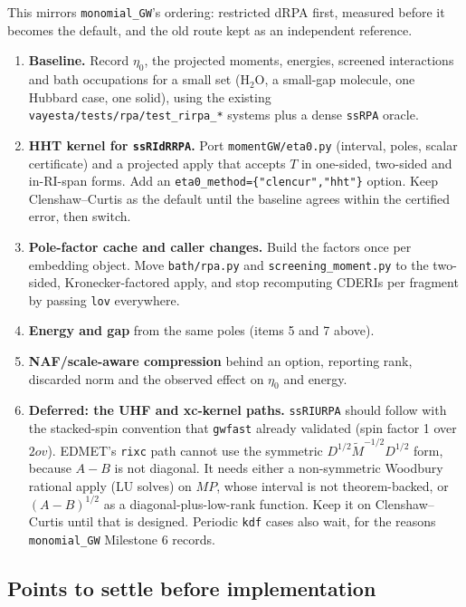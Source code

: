 \documentclass[11pt,a4paper]{article}
\newcommand{\code}[1]{\texttt{\small #1}}
\newcommand{\ov}{ov}
\newcommand{\Mt}{\tilde{M}}
\begin{document}
This mirrors \code{monomial\_GW}'s ordering: restricted dRPA first, measured before it becomes
the default, and the old route kept as an independent reference.
\begin{enumerate}
  \item \textbf{Baseline.} Record $\eta_0$, the projected moments, energies, screened
        interactions and bath occupations for a small set (H$_2$O, a small-gap molecule, one
        Hubbard case, one solid), using the existing \code{vayesta/tests/rpa/test\_rirpa\_*}
        systems plus a dense \code{ssRPA} oracle.
  \item \textbf{HHT kernel for \code{ssRIdRRPA}.} Port \code{momentGW/eta0.py} (interval, poles,
        scalar certificate) and a projected apply that accepts $T$ in one-sided, two-sided and
        in-RI-span forms. Add an \code{eta0\_method=\{"clencur","hht"\}} option. Keep
        Clenshaw--Curtis as the default until the baseline agrees within the certified error,
        then switch.
  \item \textbf{Pole-factor cache and caller changes.} Build the factors once per embedding
        object. Move \code{bath/rpa.py} and \code{screening\_moment.py} to the two-sided,
        Kronecker-factored apply, and stop recomputing CDERIs per fragment by passing
        \code{lov} everywhere.
  \item \textbf{Energy and gap} from the same poles (items 5 and 7 above).
  \item \textbf{NAF/scale-aware compression} behind an option, reporting rank, discarded norm
        and the observed effect on $\eta_0$ and energy.
  \item \textbf{Deferred: the UHF and xc-kernel paths.} \code{ssRIURPA} should follow with the
        stacked-spin convention that \code{gwfast} already validated (spin factor 1 over
        $2\ov$). EDMET's \code{rixc} path cannot use the symmetric
        $D^{1/2}\Mt^{-1/2}D^{1/2}$ form, because $A-B$ is not diagonal. It needs either a
        non-symmetric Woodbury rational apply (LU solves) on $MP$, whose interval is not
        theorem-backed, or $(A-B)^{1/2}$ as a diagonal-plus-low-rank function. Keep it on
        Clenshaw--Curtis until that is designed. Periodic \code{kdf} cases also wait, for the
        reasons \code{monomial\_GW} Milestone 6 records.
\end{enumerate}

\subsection{Points to settle before implementation}
\end{document}
